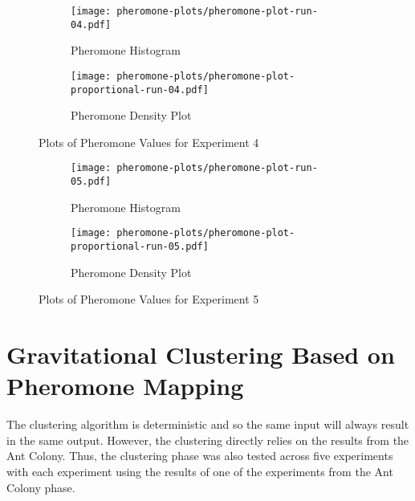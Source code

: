 \begin{figure}[H]
    \centering

    \begin{subfigure}[b]{0.49\textwidth}
        \texttt{[image: pheromone-plots/pheromone-plot-run-04.pdf]}
        \caption{Pheromone Histogram}
    \end{subfigure}
    \begin{subfigure}[b]{0.49\textwidth}
        \texttt{[image: pheromone-plots/pheromone-plot-proportional-run-04.pdf]}
        \caption{Pheromone Density Plot}
    \end{subfigure}
    \caption{\label{fig:pheromone-run-4} Plots of Pheromone Values for Experiment 4}
\end{figure}
\begin{figure}[H]
    \centering

    \begin{subfigure}[b]{0.49\textwidth}
        \texttt{[image: pheromone-plots/pheromone-plot-run-05.pdf]}
        \caption{Pheromone Histogram}
    \end{subfigure}
    \begin{subfigure}[b]{0.49\textwidth}
        \texttt{[image: pheromone-plots/pheromone-plot-proportional-run-05.pdf]}
        \caption{Pheromone Density Plot}
    \end{subfigure}
    \caption{\label{fig:pheromone-run-5} Plots of Pheromone Values for Experiment 5}
\end{figure}
\noindent{}
\restoregeometry

\section{\label{sec:results-clustering}Gravitational Clustering Based on Pheromone Mapping}
The clustering algorithm is deterministic and so the same input will always result in the same output. However, the clustering directly relies on the results from the Ant Colony. Thus, the clustering phase was also tested across five experiments with each experiment using the results of one of the experiments from the Ant Colony phase.

